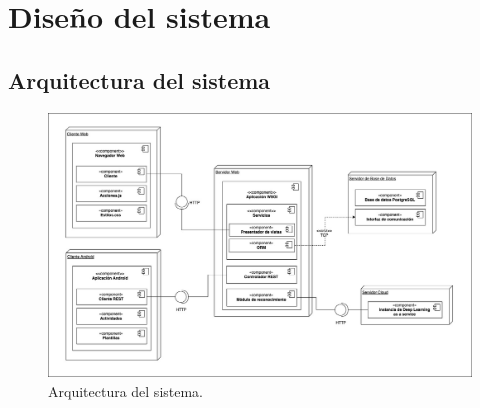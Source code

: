 \chapter{Diseño del sistema}
%



\section{Arquitectura del sistema}
\begin{figure}[h]
    \centering
    \includegraphics[width=\textwidth]{capitulo4/imagenes/ArquitecturaApp.jpg}
    \caption{Arquitectura del sistema.}
    \label{fig:arquitectura}
\end{figure}

